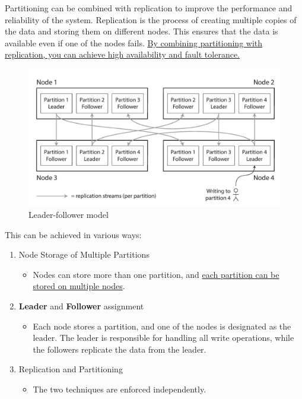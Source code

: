 \begin{paracol}{2}
   \colfill
   Partitioning can be combined with replication to improve the performance and reliability of the system. Replication is the process of creating multiple copies of the data and storing them on different nodes. This ensures that the data is available even if one of the nodes fails. \ul{By combining partitioning with replication, you can achieve high availability and fault tolerance.}
   \colfill
   
   \switchcolumn

   \begin{figure}[htbp]
      \centering
      \includegraphics[width=0.95\columnwidth]{images/11/leader_follower.png}
      \caption{Leader-follower model}
      \label{fig:11/leader_follower}
   \end{figure}
\end{paracol}

This can be achieved in various ways:
\begin{enumerate}
   \item Node Storage of Multiple Partitions
   \begin{itemize}
      \item Nodes can store more than one partition, and \ul{each partition can be stored on multiple nodes}.
   \end{itemize}
   \item \textbf{Leader} and \textbf{Follower} assignment
   \begin{itemize}
      \item Each node stores a partition, and one of the nodes is designated as the leader. The leader is responsible for handling all write operations, while the followers replicate the data from the leader.
   \end{itemize}
   \item Replication and Partitioning
   \begin{itemize}
      \item The two techniques are enforced independently.
   \end{itemize}
\end{enumerate}

